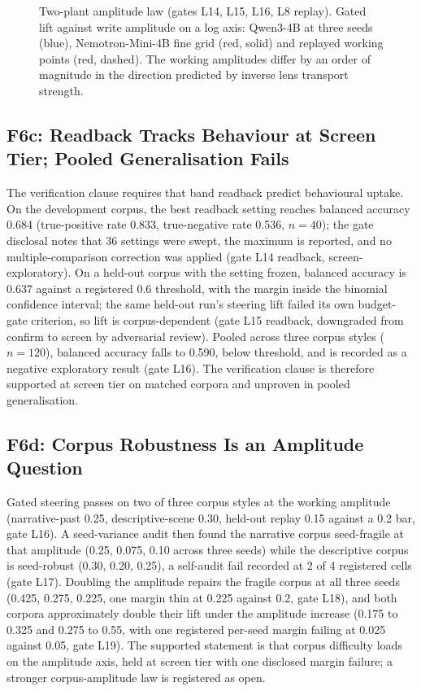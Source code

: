 \begin{figure}[t]
\centering
\resizebox{\columnwidth}{!}{}
\caption{Two-plant amplitude law (gates L14, L15, L16, L8 replay). Gated lift against write amplitude on a log axis: Qwen3-4B at three seeds (blue), Nemotron-Mini-4B fine grid (red, solid) and replayed working points (red, dashed). The working amplitudes differ by an order of magnitude in the direction predicted by inverse lens transport strength.}
\label{fig:scaling}
\end{figure}

\subsection{F6c: Readback Tracks Behaviour at Screen Tier; Pooled Generalisation Fails}
\label{sec:results:readback}

The verification clause requires that band readback predict behavioural uptake. On the development corpus, the best readback setting reaches balanced accuracy 0.684 (true-positive rate 0.833, true-negative rate 0.536, $n=40$); the gate disclosal notes that 36 settings were swept, the maximum is reported, and no multiple-comparison correction was applied (gate L14 readback, screen-exploratory). On a held-out corpus with the setting frozen, balanced accuracy is 0.637 against a registered 0.6 threshold, with the margin inside the binomial confidence interval; the same held-out run's steering lift failed its own budget-gate criterion, so lift is corpus-dependent (gate L15 readback, downgraded from confirm to screen by adversarial review). Pooled across three corpus styles ($n=120$), balanced accuracy falls to 0.590, below threshold, and is recorded as a negative exploratory result (gate L16). The verification clause is therefore supported at screen tier on matched corpora and unproven in pooled generalisation.

\subsection{F6d: Corpus Robustness Is an Amplitude Question}
\label{sec:results:corpus}

Gated steering passes on two of three corpus styles at the working amplitude (narrative-past 0.25, descriptive-scene 0.30, held-out replay 0.15 against a 0.2 bar, gate L16). A seed-variance audit then found the narrative corpus seed-fragile at that amplitude (0.25, 0.075, 0.10 across three seeds) while the descriptive corpus is seed-robust (0.30, 0.20, 0.25), a self-audit fail recorded at 2 of 4 registered cells (gate L17). Doubling the amplitude repairs the fragile corpus at all three seeds (0.425, 0.275, 0.225, one margin thin at 0.225 against 0.2, gate L18), and both corpora approximately double their lift under the amplitude increase (0.175 to 0.325 and 0.275 to 0.55, with one registered per-seed margin failing at 0.025 against 0.05, gate L19). The supported statement is that corpus difficulty loads on the amplitude axis, held at screen tier with one disclosed margin failure; a stronger corpus-amplitude law is registered as open.

